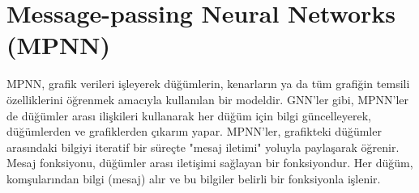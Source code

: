 \section{Message-passing Neural Networks (MPNN)}

MPNN, grafik verileri işleyerek düğümlerin, kenarların ya da tüm grafiğin temsili özelliklerini öğrenmek amacıyla kullanılan bir modeldir. GNN'ler gibi, MPNN'ler de düğümler arası ilişkileri kullanarak her düğüm için bilgi güncelleyerek, düğümlerden ve grafiklerden çıkarım yapar. MPNN'ler, grafikteki düğümler arasındaki bilgiyi iteratif bir süreçte "mesaj iletimi" yoluyla paylaşarak öğrenir. Mesaj fonksiyonu, düğümler arası iletişimi sağlayan bir fonksiyondur. Her düğüm, komşularından bilgi (mesaj) alır ve bu bilgiler belirli bir fonksiyonla işlenir.

\newpage